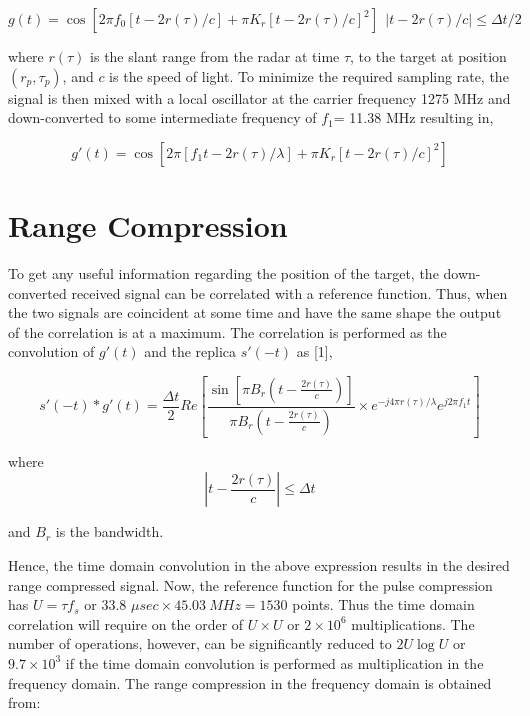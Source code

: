 \begin{equation}
\label{ }
g(t)=\cos \left [ 2 \pi f_0 [t-2r(\tau)/c  ]+ \pi K_r  [ t -2 r(\tau)/c ] ^2  \right  ]~~| t-2r(\tau)/c | \leq \Delta t/2
\end{equation}

where $r(\tau)$ is the slant range from the radar at time $\tau$, to the target at position $(r_p,\tau_p)$, and $c$ is the speed of light. To minimize the required sampling rate, the signal is then mixed with a local oscillator at the carrier frequency 1275 MHz and down-converted to some intermediate frequency of $f_1 $= 11.38 MHz resulting in,

\begin{equation}
\label{eq:matchedFilter}
g'(t)=\cos \left [  2 \pi [f_1 t-2r(\tau)/\lambda  ]+ \pi K_r \left [ t -2 r(\tau)/c \right ]^2 \right ] 
\end{equation}

\section{Range Compression}

To get any useful information regarding the position of the target, the down-converted received signal can be correlated with a reference function. Thus, when the two signals are coincident at some  time and have the same shape the output of the correlation is at a maximum. The correlation is performed as the convolution of $g'(t)$ and the replica $s'(-t)$ as [1],


\begin{equation}
\label{eq:convolution}
s'(-t)*g'(t) = \frac{\Delta t}{2 }Re \left [  \frac { \sin   [\pi B_r  ( t-\frac{2r(\tau)}{c} )]  } {\pi B_r (  t-\frac{2r(\tau)}{c} )}  
\times e^{-j4 \pi r(\tau)/\lambda } e^{j2 \pi f_1 t } \right ]   
\end{equation}


where
\begin{equation}
\label{eq:convolution-condition}
| t-\frac{2r(\tau)}{c} | \leq \Delta t
\end{equation}



and  $B_r$ is the bandwidth.



Hence, the time domain convolution in the above expression results in the desired range compressed signal. Now, the reference function for the pulse compression has $U=\tau f_s$ or 33.8 $\mu sec \times 45.03 ~MHz =1530$ points. Thus the time domain correlation will require on the order of $U\times U $ or $2\times 10^6$ multiplications. The number of operations, however, can be significantly reduced to $2U\log U $ or $9.7\times 10^3$ if the time domain convolution is performed as multiplication in the frequency domain. The range compression in the frequency domain is obtained from:





